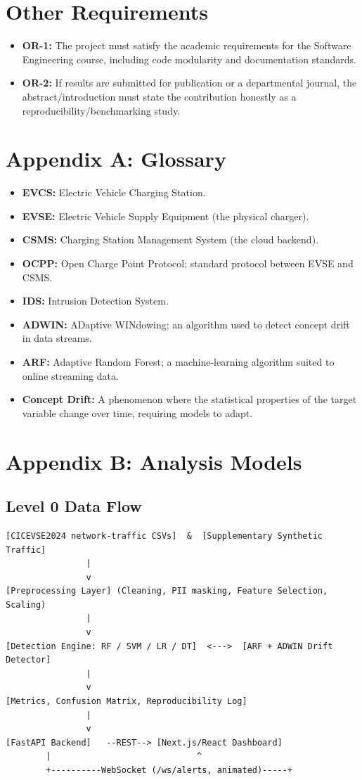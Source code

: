 \documentclass[11pt, a4paper]{article}
\begin{document}
\section{Other Requirements}
\begin{itemize}
    \item \textbf{OR-1:} The project must satisfy the academic requirements for the Software Engineering course, including code modularity and documentation standards.
    \item \textbf{OR-2:} If results are submitted for publication or a departmental journal, the abstract/introduction must state the contribution honestly as a reproducibility/benchmarking study.
\end{itemize}

\appendix
\section{Appendix A: Glossary}
\begin{itemize}
    \item \textbf{EVCS:} Electric Vehicle Charging Station.
    \item \textbf{EVSE:} Electric Vehicle Supply Equipment (the physical charger).
    \item \textbf{CSMS:} Charging Station Management System (the cloud backend).
    \item \textbf{OCPP:} Open Charge Point Protocol; standard protocol between EVSE and CSMS.
    \item \textbf{IDS:} Intrusion Detection System.
    \item \textbf{ADWIN:} ADaptive WINdowing; an algorithm used to detect concept drift in data streams.
    \item \textbf{ARF:} Adaptive Random Forest; a machine-learning algorithm suited to online streaming data.
    \item \textbf{Concept Drift:} A phenomenon where the statistical properties of the target variable change over time, requiring models to adapt.
\end{itemize}

\section{Appendix B: Analysis Models}

\subsection{Level 0 Data Flow}
\begin{verbatim}
[CICEVSE2024 network-traffic CSVs]  &  [Supplementary Synthetic Traffic]
                |
                v
[Preprocessing Layer] (Cleaning, PII masking, Feature Selection, Scaling)
                |
                v
[Detection Engine: RF / SVM / LR / DT]  <--->  [ARF + ADWIN Drift Detector]
                |
                v
[Metrics, Confusion Matrix, Reproducibility Log]
                |
                v
[FastAPI Backend]   --REST--> [Next.js/React Dashboard]
        |                             ^
        +----------WebSocket (/ws/alerts, animated)-----+
\end{verbatim}
\end{document}
